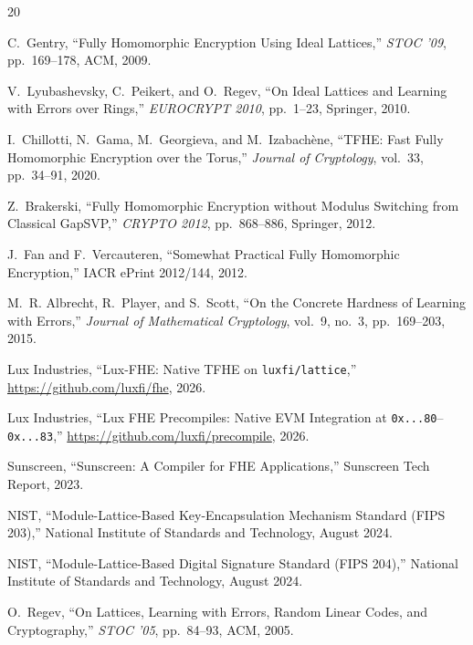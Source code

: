 \begin{thebibliography}{20}

C.~Gentry, ``Fully Homomorphic Encryption Using Ideal Lattices,'' \emph{STOC '09},
pp.~169--178, ACM, 2009.

V.~Lyubashevsky, C.~Peikert, and O.~Regev, ``On Ideal Lattices and Learning with
Errors over Rings,'' \emph{EUROCRYPT 2010}, pp.~1--23, Springer, 2010.

I.~Chillotti, N.~Gama, M.~Georgieva, and M.~Izabach\`ene, ``TFHE: Fast Fully
Homomorphic Encryption over the Torus,'' \emph{Journal of Cryptology}, vol.~33,
pp.~34--91, 2020.

Z.~Brakerski, ``Fully Homomorphic Encryption without Modulus Switching from Classical
GapSVP,'' \emph{CRYPTO 2012}, pp.~868--886, Springer, 2012.

J.~Fan and F.~Vercauteren, ``Somewhat Practical Fully Homomorphic Encryption,''
IACR ePrint 2012/144, 2012.

M.~R. Albrecht, R.~Player, and S.~Scott, ``On the Concrete Hardness of Learning with
Errors,'' \emph{Journal of Mathematical Cryptology}, vol.~9, no.~3, pp.~169--203, 2015.

Lux Industries, ``Lux-FHE: Native TFHE on \texttt{luxfi/lattice},''
\url{https://github.com/luxfi/fhe}, 2026.

Lux Industries, ``Lux FHE Precompiles: Native EVM Integration at
\texttt{0x...80}--\texttt{0x...83},'' \url{https://github.com/luxfi/precompile}, 2026.

Sunscreen, ``Sunscreen: A Compiler for FHE Applications,'' Sunscreen Tech Report, 2023.

NIST, ``Module-Lattice-Based Key-Encapsulation Mechanism Standard (FIPS 203),''
National Institute of Standards and Technology, August 2024.

NIST, ``Module-Lattice-Based Digital Signature Standard (FIPS 204),''
National Institute of Standards and Technology, August 2024.

O.~Regev, ``On Lattices, Learning with Errors, Random Linear Codes, and Cryptography,''
\emph{STOC '05}, pp.~84--93, ACM, 2005.

\end{thebibliography}

